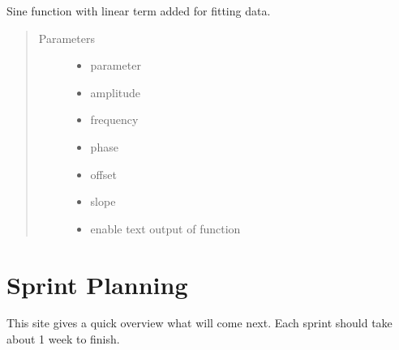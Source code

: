 \documentclass[letterpaper,10pt,english]{sphinxmanual}
\begin{document}

\begin{fulllineitems}
\label{\detokenize{fit-functions:fit_functions.sine_lin}}
Sine function with linear term added for fitting data.
\begin{quote}\begin{description}
\item[{Parameters}] \leavevmode\begin{itemize}
\item {} 
 \textendash{} parameter

\item {} 
 \textendash{} amplitude

\item {} 
 \textendash{} frequency

\item {} 
 \textendash{} phase

\item {} 
 \textendash{} offset

\item {} 
 \textendash{} slope

\item {} 
 \textendash{} enable text output of function

\end{itemize}

\end{description}\end{quote}

\end{fulllineitems}



\chapter{Sprint Planning}
\label{\detokenize{sprints:sprint-planning}}\label{\detokenize{sprints::doc}}
This site gives a quick overview what will come next. Each sprint should take about 1 week to finish.
\end{document}
